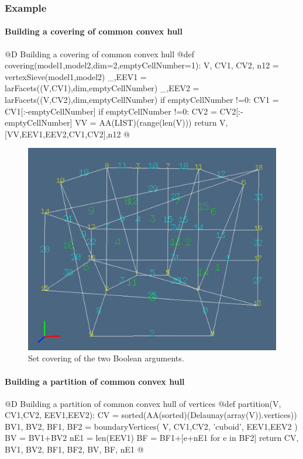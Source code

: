 \documentclass[11pt,oneside]{article}	%
\begin{document}
\subsubsection{Example}

\paragraph{Building a covering of common convex hull}

@D Building a covering of common convex hull
@{def covering(model1,model2,dim=2,emptyCellNumber=1):
	V, CV1, CV2, n12 = vertexSieve(model1,model2)
	_,EEV1 = larFacets((V,CV1),dim,emptyCellNumber)
	_,EEV2 = larFacets((V,CV2),dim,emptyCellNumber)
	if emptyCellNumber !=0: CV1 = CV1[:-emptyCellNumber]
	if emptyCellNumber !=0: CV2 = CV2[:-emptyCellNumber]
	VV = AA(LIST)(range(len(V)))
	return V,[VV,EEV1,EEV2,CV1,CV2],n12
@}

\begin{figure}[htbp] %
   \centering
   \includegraphics[width=0.6\linewidth]{images/covering} 
   \caption{Set covering of the two Boolean arguments.}
   \label{fig:example}
\end{figure}

\paragraph{Building a partition of common convex hull}

@D Building a partition of common convex hull of vertices
@{def partition(V, CV1,CV2, EEV1,EEV2):
	CV = sorted(AA(sorted)(Delaunay(array(V)).vertices))
	BV1, BV2, BF1, BF2 = boundaryVertices( V, CV1,CV2, 'cuboid', EEV1,EEV2 )
	BV = BV1+BV2
	nE1 = len(EEV1)
	BF = BF1+[e+nE1 for e in BF2]
	return CV, BV1, BV2, BF1, BF2, BV, BF, nE1
@}
\end{document}
